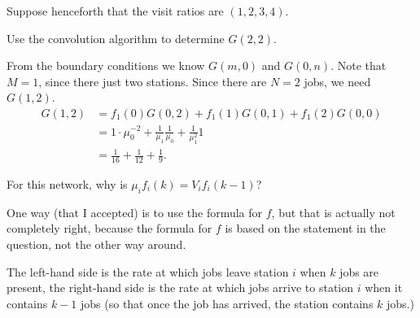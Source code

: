 Suppose henceforth that the visit ratios are $(1,2,3,4)$. 

\begin{exercise}[201706]
 Use the convolution algorithm to determine $G(2,2)$.
\begin{solution}
 From the boundary conditions we know $G(m, 0)$ and $G(0,n)$. Note
 that $M=1$, since there just two stations. Since there are $N=2$
 jobs, we need $G(1,2)$. 
 \begin{equation*}
 \begin{split}
 G(1,2) &= f_1(0) G(0, 2) + f_1(1) G(0, 1) + f_1(2) G(0,0) \\
 &= 1\cdot \mu_0^{-2} + \frac1{\mu_1} \frac{1}{\mu_0} + \frac{1}{\mu_1^2} 1 \\
 &= \frac 1{16} + \frac1{12} + \frac{1}{9}.
 \end{split}
 \end{equation*}
\end{solution}
\end{exercise}

\begin{exercise}[201706]
For this network, why is $\mu_i f_i(k) = V_i f_i(k-1)$? 
\begin{solution}
 One way (that I accepted) is to use the formula for $f$, but that is actually not completely right, because the formula for $f$ is based on the statement in the question, not the other way around. 

The left-hand side is the rate at which jobs leave station $i$ when $k$ jobs are present, the right-hand side is the rate at which jobs arrive to station $i$ when it contains $k-1$ jobs (so that once the job has arrived, the station contains $k$ jobs.)
\end{solution}
\end{exercise}



